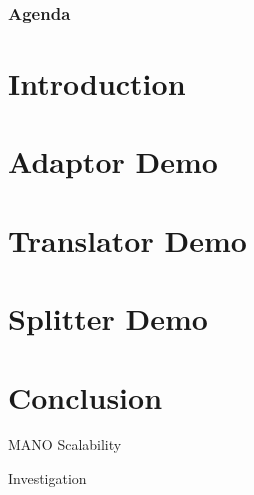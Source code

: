 \documentclass{beamer}
\begin{document}
{
\upbtitlebackground 
\begin{frame}
\titlepage %
\end{frame}
}

\begin{frame}
\frametitle{Agenda} %
\tableofcontents 

\section{Introduction}
\section{Adaptor Demo}
\section{Translator Demo}
\section{Splitter Demo}
\section{Conclusion}



\end{frame}






\begin{frame}
\Huge{\centerline{MANO Scalability}}
\Huge{\centerline{Investigation}}
\end{frame}




\end{document}
